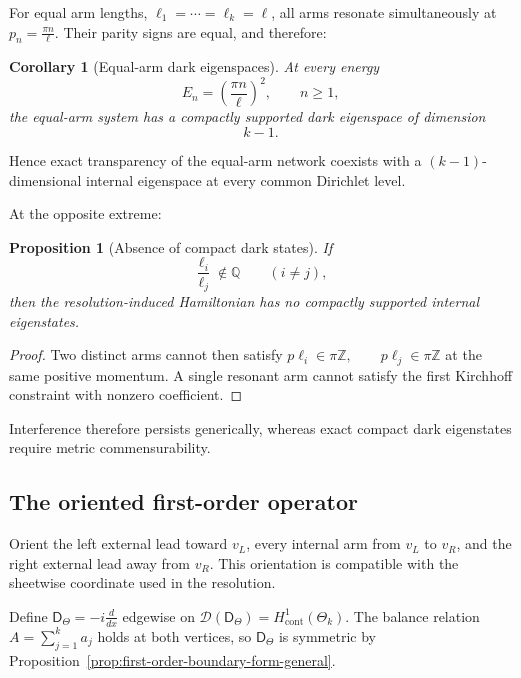 \documentclass[11pt]{article}
\theoremstyle{plain}
\newtheorem{proposition}[theorem]{Proposition}
\newtheorem{corollary}[theorem]{Corollary}
\theoremstyle{definition}
\begin{document}
For equal arm lengths,
\(\ell_1=\cdots=\ell_k=\ell\),
all arms resonate simultaneously at
\(p_n=\frac{\pi n}{\ell}\).
Their parity signs are equal, and therefore:

\begin{corollary}[Equal-arm dark eigenspaces]
\label{cor:split-rejoin-equal-dark}
At every energy
\[
  E_n
  =
  \left(
    \frac{\pi n}{\ell}
  \right)^2,
  \qquad
  n\geq1,
\]
the equal-arm system has a compactly supported dark eigenspace of dimension
\[
  k-1.
\]
\end{corollary}

Hence exact transparency of the equal-arm network coexists with a
\((k-1)\)-dimensional internal eigenspace at every common Dirichlet level.

At the opposite extreme:

\begin{proposition}[Absence of compact dark states]
\label{prop:split-rejoin-generic-no-dark}
If
\[
  \frac{\ell_i}{\ell_j}\notin\mathbb Q
  \qquad
  (i\neq j),
\]
then the resolution-induced Hamiltonian has no compactly supported internal
eigenstates.
\end{proposition}

\begin{proof}
Two distinct arms cannot then satisfy \(p\ell_i\in\pi\mathbb Z, \qquad p\ell_j\in\pi\mathbb Z\) at the same positive momentum. A single resonant arm cannot satisfy the
first Kirchhoff constraint with nonzero coefficient.
\end{proof}

Interference therefore persists generically, whereas exact compact dark
eigenstates require metric commensurability.

\subsection{The oriented first-order operator}
\label{subsec:split-rejoin-first-order}
\label{subsec:split-rejoin-deficiency}
\label{subsec:split-rejoin-SA}
\label{subsec:split-rejoin-tree-comparison}

Orient the left external lead toward \(v_L\), every internal arm from
\(v_L\) to \(v_R\), and the right external lead away from \(v_R\). This
orientation is compatible with the sheetwise coordinate used in the
resolution.

Define \(\mathsf D_\Theta = -i\frac{d}{dx}\) edgewise on
\(\mathcal D(\mathsf D_\Theta) = H^1_{\mathrm{cont}}(\Theta_k)\).
The balance relation \(A=\sum_{j=1}^{k}a_j\) holds at both vertices, so
\(\mathsf D_\Theta\) is symmetric by
Proposition~\ref{prop:first-order-boundary-form-general}.
\end{document}
